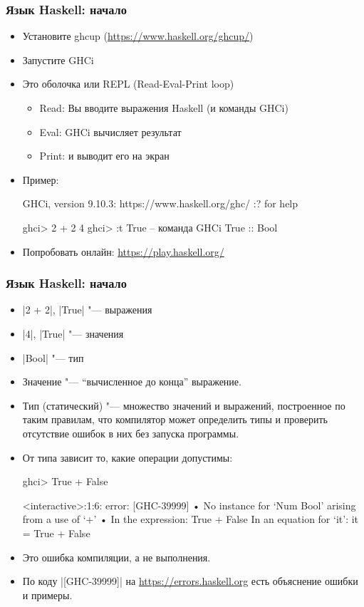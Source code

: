 \documentclass[10pt]{beamer}
\begin{document}
\begin{frame}[fragile]
  \frametitle{Язык Haskell: начало}
  \begin{itemize}
    \item Установите ghcup (\url{https://www.haskell.org/ghcup/})
    \item Запустите GHCi
    \item Это оболочка или REPL (Read-Eval-Print loop)
          \begin{itemize}
            \item Read: Вы вводите выражения Haskell (и команды GHCi)
            \item Eval: GHCi вычисляет результат
            \item Print: и выводит его на экран
          \end{itemize}
    \item Пример:
          \begin{ghcismall}
            GHCi, version 9.10.3: https://www.haskell.org/ghc/  :? for help
          \end{ghcismall}
          \begin{haskell}
            ghci> 2 + 2
            4
            ghci> :t True -- команда GHCi
            True :: Bool
          \end{haskell}
    \item Попробовать онлайн: \url{https://play.haskell.org/}
  \end{itemize}
\end{frame}

\begin{frame}[fragile]
  \frametitle{Язык Haskell: начало}
  \begin{itemize}
    \item \haskinline|2 + 2|, \haskinline|True| "--- выражения
    \item \haskinline|4|, \haskinline|True| "--- значения
    \item \haskinline|Bool| "--- тип
          \pause
    \item Значение "--- \enquote{вычисленное до конца} выражение.
    \item Тип (статический) "--- множество значений и выражений, построенное по таким правилам, что компилятор может определить типы и проверить отсутствие ошибок в них без запуска программы.
    \item От типа зависит то, какие операции допустимы:
          \begin{haskell}
            ghci> True + False
          \end{haskell}
          \begin{ghcismall}
            <interactive>:1:6: error: [GHC-39999]
                • No instance for ‘Num Bool’ arising from a use of ‘+’
                • In the expression: True + False
                  In an equation for ‘it’: it = True + False
          \end{ghcismall}
    \item Это ошибка компиляции, а не выполнения.
    \item По коду \ghcinline|[GHC-39999]| на \url{https://errors.haskell.org} есть объяснение ошибки и примеры.
  \end{itemize}
\end{frame}
\end{document}
